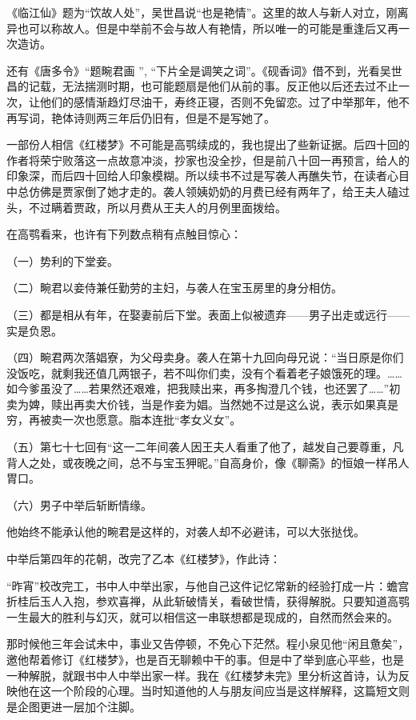 \par 《临江仙》题为“饮故人处”，吴世昌说“也是艳情”。这里的故人与新人对立，刚离异也可以称故人。但是中举前不会与故人有艳情，所以唯一的可能是重逢后又再一次造访。
\par 还有《唐多令》“题畹君画 ”, “下片全是调笑之词”。《砚香词》借不到，光看吴世昌的记载，无法揣测时期，也可能题扇是他们从前的事。反正他以后还去过不止一次，让他们的感情渐趋灯尽油干，寿终正寝，否则不免留恋。过了中举那年，他不再写词，艳体诗则两三年后仍旧有，但是不是写她了。
\par 一部份人相信《红楼梦》不可能是高鹗续成的，我也提出了些新证据。后四十回的作者将荣宁败落这一点故意冲淡，抄家也没全抄，但是前八十回一再预言，给人的印象深，而后四十回给人印象模糊。所以续书不过是写袭人再醮失节，在读者心目中总仿佛是贾家倒了她才走的。袭人领姨奶奶的月费已经有两年了，给王夫人磕过头，不过瞒着贾政，所以月费从王夫人的月例里面拨给。
\par 在高鹗看来，也许有下列数点稍有点触目惊心：
\par （一）势利的下堂妾。
\par （二）畹君以妾侍兼任勤劳的主妇，与袭人在宝玉房里的身分相仿。
\par （三）都是相从有年，在娶妻前后下堂。表面上似被遗弃——男子出走或远行——实是负恩。
\par （四）畹君两次落娼寮，为父母卖身。袭人在第十九回向母兄说：“当日原是你们没饭吃，就剩我还值几两银子，若不叫你们卖，没有个看着老子娘饿死的理。……如今爹虽没了……若果然还艰难，把我赎出来，再多掏澄几个钱，也还罢了……”初卖为婢，赎出再卖大价钱，当是作妾为娼。当然她不过是这么说，表示如果真是穷，再被卖一次也愿意。脂本连批“孝女义女”。
\par （五）第七十七回有“这一二年间袭人因王夫人看重了他了，越发自己要尊重，凡背人之处，或夜晚之间，总不与宝玉狎昵。”自高身价，像《聊斋》的恒娘一样吊人胃口。
\par （六）男子中举后斩断情缘。
\par 他始终不能承认他的畹君是这样的，对袭人却不必避讳，可以大张挞伐。
\par 中举后第四年的花朝，改完了乙本《红楼梦》，作此诗：
\par “昨宵”校改完工，书中人中举出家，与他自己这件记忆常新的经验打成一片：蟾宫折桂后玉人入抱，参欢喜禅，从此斩破情关，看破世情，获得解脱。只要知道高鹗一生最大的胜利与幻灭，就可以相信这一串联想都是现成的，自然而然会来的。
\par 那时候他三年会试未中，事业又告停顿，不免心下茫然。程小泉见他“闲且惫矣”，邀他帮着修订《红楼梦》，也是百无聊赖中干的事。但是中了举到底心平些，也是一种解脱，就跟书中人中举出家一样。我在《红楼梦未完》里分析这首诗，认为反映他在这一个阶段的心理。当时知道他的人与朋友间应当是这样解释，这篇短文则是企图更进一层加个注脚。



